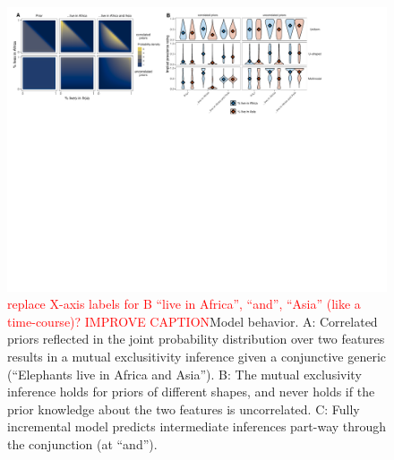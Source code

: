 \documentclass[10pt,letterpaper]{article}
\newcommand{\red}[1]{{\textcolor{Red}{#1}}}
\begin{document}
\begin{figure}[t]
  \centering
    \includegraphics[width=1\textwidth]{model}
  \caption{\red{replace X-axis labels for B ``live in Africa'', ``and'', ``Asia'' (like a time-course)? IMPROVE CAPTION}Model behavior. A: Correlated priors reflected in the joint probability distribution over two features results in a mutual exclusitivity inference given a conjunctive generic (``Elephants live in Africa and Asia''). B: The mutual exclusivity inference holds for priors of different shapes, and never holds if the prior knowledge about the two features is uncorrelated. C: Fully incremental model predicts intermediate inferences part-way through the conjunction (at ``and'').
  }
  \label{fig:model}
\end{figure}
\end{document}
